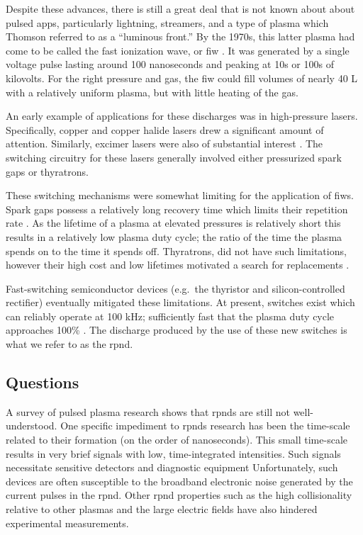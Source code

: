 Despite these advances, there is still a great deal that is not known about
about pulsed \acs{app}s, particularly lightning, streamers, and a type of plasma
which Thomson referred to as a ``luminous front.'' By the 1970s, this latter
plasma had come to be called the fast ionization wave, or \acs{fiw}
\cite{Vasilyak1994}. It was generated by a single voltage pulse lasting around
100 nanoseconds and peaking at 10s or 100s of kilovolts. For the right pressure
and gas, the \acs{fiw} could fill volumes of nearly 40 L with a relatively
uniform plasma, but with little heating of the gas.

An early example of applications for these discharges was in high-pressure
lasers. Specifically, copper \cite{Kushner1983} and copper halide
\cite{Pack1977} lasers drew a significant amount of attention. Similarly,
excimer lasers were also of substantial interest \cite{Shimada1985}. The
switching circuitry for these lasers generally involved either pressurized spark
gaps or thyratrons.

These switching mechanisms were somewhat limiting for the application of
\acs{fiw}s. Spark gaps possess a relatively long recovery time which limits
their repetition rate \cite{Moran1991}. As the lifetime of a plasma at elevated
pressures is relatively short this results in a relatively low plasma duty
cycle; the ratio of the time the plasma spends on to the time it spends off.
Thyratrons, did not have such limitations, however their high cost and low
lifetimes motivated a search for replacements \cite{Partlo1995}.

Fast-switching semiconductor devices (e.g.\ the thyristor and silicon-controlled
rectifier) eventually mitigated these limitations. At present, switches exist
which can reliably operate at 100 kHz; sufficiently fast that the
plasma duty cycle approaches 100\% \cite{Efanov1997}. The discharge produced by
the use of these new switches is what we refer to as the \acs{rpnd}.

\subsection{Questions}

A survey of pulsed plasma research shows that \acs{rpnd}s are still not
well-understood. One specific impediment to \acs{rpnd}s research has been the
time-scale related to their formation (on the order of nanoseconds). This small
time-scale results in very brief signals with low, time-integrated intensities.
Such signals necessitate sensitive detectors and diagnostic equipment
Unfortunately, such devices are often susceptible to the broadband electronic
noise generated by the current pulses in the \acs{rpnd}. Other \acs{rpnd}
properties such as the high collisionality relative to other plasmas and the
large electric fields have also hindered experimental measurements.

